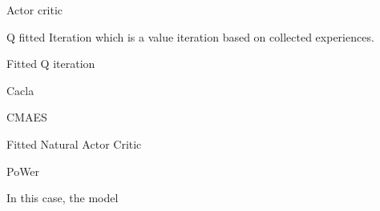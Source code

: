 Actor critic

Q fitted Iteration which is a value iteration based on collected experiences.

Fitted Q iteration

Cacla

CMAES

Fitted Natural Actor Critic 

PoWer


In this case, the model